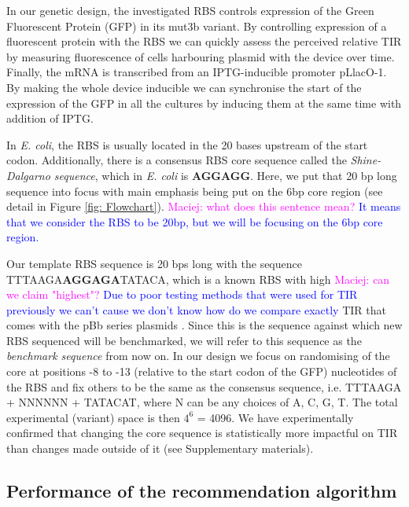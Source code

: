 \documentclass{article}
\newcommand{\mengyan}[1]{\textcolor{magenta}{#1}}
\newcommand{\maciej}[1]{\textcolor{blue}{#1}}
\begin{document}
In our genetic design, the investigated RBS controls expression of the Green Fluorescent Protein (GFP) in its mut3b variant. 
By controlling expression of a fluorescent protein with the RBS we can quickly assess the perceived relative TIR by measuring fluorescence of cells harbouring plasmid with the device over time.
Finally, the mRNA is transcribed from an IPTG-inducible promoter pLlacO-1. 
By making the whole device inducible we can synchronise the start of the expression of the GFP in all the cultures by inducing them at the same time with addition of IPTG.

In \emph{E. coli}, the RBS is usually located in the 20 bases upstream of the start codon. 
Additionally, there is a consensus RBS core sequence called the \textit{Shine-Dalgarno sequence}, which in \emph{E. coli} is \textbf{AGGAGG}. 
Here, we put that 20 bp long sequence into focus with main emphasis being put on the 6bp core region (see detail in Figure \ref{fig: Flowchart}). \mengyan{Maciej: what does this sentence mean?} \maciej{It means that we consider the RBS to be 20bp, but we will be focusing on the 6bp core region.}

Our template RBS sequence is 20 bps long with the sequence TTTAAGA\textbf{AGGAGA}TATACA, 
which is a known RBS with high \mengyan{Maciej: can we claim "highest"?} \maciej{Due to poor testing methods that were used for TIR previously we can't cause we don't know how do we compare exactly} TIR that comes with the pBb series plasmids \cite{Lee2011}. 
Since this is the sequence against which new RBS sequenced will be benchmarked,
we will refer to this sequence as the \textit{benchmark sequence} from now on.
In our design we focus on randomising of the core at positions -8 to -13 (relative to the start codon of the GFP) nucleotides of the RBS and fix others to be the same as the consensus sequence, i.e. TTTAAGA + NNNNNN + TATACAT, where N can be any choices of A, C, G, T. 
The total experimental (variant) space is then $4^6$ = 4096.
We have experimentally confirmed that changing the core sequence is statistically more impactful on TIR than changes made outside of it (see Supplementary materials).

\subsection{Performance of the recommendation algorithm}
 
\end{document}

